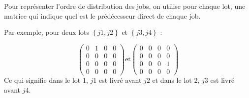 \documentclass{article}
\begin{document}
Pour représenter l'ordre de distribution des jobs, on utilise pour chaque lot, une matrice qui indique quel est le prédécesseur direct de chaque job.

Par exemple, pour deux lots $\left\{j1,j2\right\}$ et $\left\{ j3, j4\right\}$ :

$$
	\begin{pmatrix}
		0 & 1 & 0 & 0 \\
		0 & 0 & 0 & 0 \\
		0 & 0 & 0 & 0 \\
		0 & 0 & 0 & 0
	\end{pmatrix}
	\text{et}
	\begin{pmatrix}
		0 & 0 & 0 & 0 \\
		0 & 0 & 0 & 0 \\
		0 & 0 & 0 & 1 \\
		0 & 0 & 0 & 0
	\end{pmatrix}
$$
Ce qui signifie dans le lot 1, $j1$ est livré avant $j2$ et dans le lot 2, $j3$ est livré avant $j4$.
\end{document}
